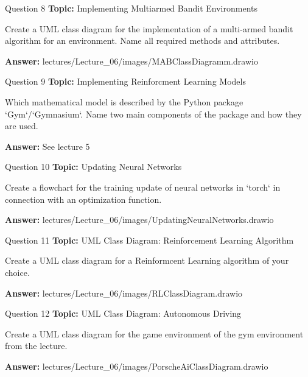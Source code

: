 \begin{frame}{Question 8}
    \textbf{Topic:} Implementing Multiarmed Bandit Environments
    \vspace{10pt}

    Create a UML class diagram for the implementation of a multi-armed bandit algorithm for an environment. Name all required methods and attributes. 
    \vspace{20pt}

    \textbf{Answer:} lectures/Lecture\_06/images/MABClassDiagramm.drawio
\end{frame}

\begin{frame}{Question 9}
    \textbf{Topic:} Implementing Reinforcment Learning Models
    \vspace{10pt}

    Which mathematical model is described by the Python package `Gym`/`Gymnasium`. Name two main components of the package and how they are used. 
    \vspace{20pt}

    \textbf{Answer:} See lecture 5
\end{frame}

\begin{frame}{Question 10}
    \textbf{Topic:} Updating Neural Networks
    \vspace{10pt}

    Create a flowchart for the training update of neural networks in `torch` in connection with an optimization function.
    \vspace{20pt}

    \textbf{Answer:} lectures/Lecture\_06/images/UpdatingNeuralNetworks.drawio
\end{frame}

\begin{frame}{Question 11}
    \textbf{Topic:} UML Class Diagram: Reinforcement Learning Algorithm
    \vspace{10pt}

    Create a UML class diagram for a Reinformcent Learning algorithm of your choice. 
    \vspace{20pt}

    \textbf{Answer:} lectures/Lecture\_06/images/RLClassDiagram.drawio
\end{frame}

\begin{frame}{Question 12}
    \textbf{Topic:} UML Class Diagram: Autonomous Driving
    \vspace{10pt}

    Create a UML class diagram for the game environment of the gym environment from the lecture.
    \vspace{20pt}

    \textbf{Answer:} lectures/Lecture\_06/images/PorscheAiClassDiagram.drawio
\end{frame}


